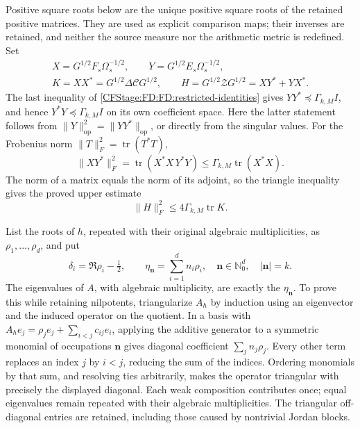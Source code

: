 Positive square roots below are the unique positive square roots of the
retained positive matrices.  They are used as explicit comparison maps;
their inverses are retained, and neither the source measure nor the
arithmetic metric is redefined.  Set
\begin{equation}
\begin{gathered}
X=G^{1/2}F_s\Omega_s^{-1/2},\qquad
Y=G^{1/2}E_s\Omega_s^{-1/2},\\
K=XX^*=G^{1/2}\Delta\mathcal C G^{1/2},\qquad
H=G^{1/2}\mathcal ZG^{1/2}=XY^*+YX^*.
\end{gathered}
\tag{FD.28}\label{CFStage:FD:FD:comparison-maps}
\end{equation}
The last inequality of \eqref{CFStage:FD:FD:restricted-identities} gives
\(YY^*\preceq\Gamma_{k,M}I\), and hence
\(Y^*Y\preceq\Gamma_{k,M}I\) on its own coefficient space.  Here the
latter statement follows from \(\|Y\|_{\mathrm{op}}^2
=\|YY^*\|_{\mathrm{op}}\), or directly from the singular values.
For the Frobenius norm \(\|T\|_F^2=\operatorname{tr}(T^*T)\),
\[
\|XY^*\|_F^2
=\operatorname{tr}(X^*X\,Y^*Y)
\le\Gamma_{k,M}\operatorname{tr}(X^*X).
\]
The norm of a matrix equals the norm of its adjoint, so the triangle
inequality gives the proved upper estimate
\begin{equation}
\|H\|_F^2\le4\Gamma_{k,M}\operatorname{tr}K.
\tag{FD.29}\label{CFStage:FD:FD:Frobenius-upper}
\end{equation}

List the roots of \(h\), repeated with their original algebraic
multiplicities, as \(\rho_1,\ldots,\rho_d\), and put
\begin{equation}
\delta_i=\Re\rho_i-\tfrac12,\qquad
\eta_{\mathbf n}=\sum_{i=1}^dn_i\rho_i,
\quad \mathbf n\in\mathbb N_0^d,\quad |\mathbf n|=k.
\tag{FD.30}\label{CFStage:FD:FD:spectral-positions}
\end{equation}
The eigenvalues of \(A\), with algebraic multiplicity, are exactly the
\(\eta_{\mathbf n}\).  To prove this while retaining nilpotents,
triangularize \(A_h\) by induction using an eigenvector and the induced
operator on the quotient.  In a basis with
\(A_he_j=\rho_je_j+\sum_{i<j}c_{ij}e_i\), applying the additive
generator to a symmetric monomial of occupations \(\mathbf n\) gives
diagonal coefficient \(\sum_jn_j\rho_j\).  Every other term replaces
an index \(j\) by \(i<j\), reducing the sum of the indices.  Ordering
monomials by that sum, and resolving ties arbitrarily, makes the
operator triangular with precisely the displayed diagonal.  Each weak
composition contributes once; equal eigenvalues remain repeated with
their algebraic multiplicities.  The triangular off-diagonal entries
are retained, including those caused by nontrivial Jordan blocks.

